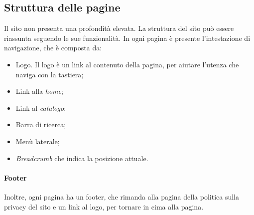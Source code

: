 \documentclass[12pt, a4paper]{article}
\begin{document}
    \subsection{Struttura delle pagine}
    Il sito non presenta una profondità elevata. La struttura del sito può essere riassunta seguendo le sue funzionalità. In ogni pagina è presente l'intestazione di navigazione, che è composta da:
    \begin{itemize}
        \item Logo. Il logo è un link al contenuto della pagina, per aiutare l'utenza che naviga con la tastiera;
        \item Link alla \textit{home};
        \item Link al \textit{catalogo};
        \item Barra di ricerca;
        \item Menù laterale;
        \item \textit{Breadcrumb} che indica la posizione attuale.
    \end{itemize}

    \paragraph{Footer}
    Inoltre, ogni pagina ha un footer, che rimanda alla pagina della politica sulla privacy del sito e un link al logo, per tornare in cima alla pagina.
\end{document}
